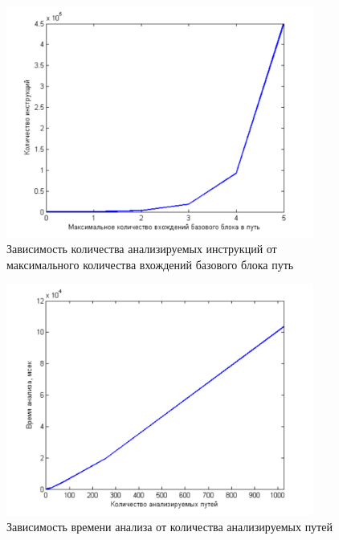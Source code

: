 \begin{figure}
  \centering
  \includegraphics[width=0.9\textwidth]{inc/png/graphic2}
  \caption{Зависимость количества анализируемых инструкций от максимального количества вхождений базового блока путь}
  \label{fig:graphic2}
\end{figure}

\begin{figure}
  \centering
  \includegraphics[width=0.9\textwidth]{inc/png/graphic3}
  \caption{Зависимость времени анализа от количества анализируемых путей}
  \label{fig:graphic3}
\end{figure}

